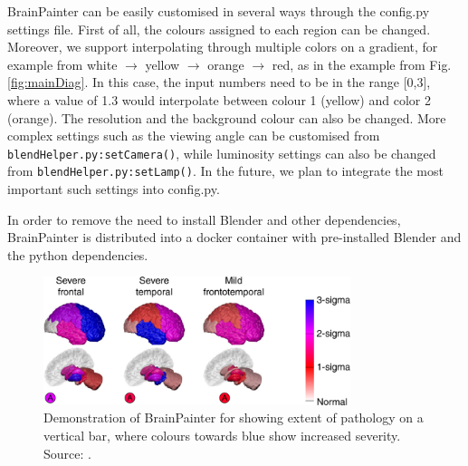 \documentclass{llncs}
\begin{document}

BrainPainter can be easily customised in several ways through the config.py settings file. First of all, the colours assigned to each region can be changed. Moreover, we support interpolating through multiple colors on a gradient, for example from white $\rightarrow$ yellow $\rightarrow$ orange $\rightarrow$ red, as in the example from Fig. \ref{fig:mainDiag}. In this case, the input numbers need to be in the range [0,3], where a value of 1.3 would interpolate between colour 1 (yellow) and color 2 (orange). The resolution and the background colour can also be changed. More complex settings such as the viewing angle can be customised from \verb|blendHelper.py:setCamera()|, while luminosity settings can also be changed from \verb|blendHelper.py:setLamp()|. In the future, we plan to integrate the most important such settings into config.py. 

In order to remove the need to install Blender and other dependencies, BrainPainter is distributed into a docker container with pre-installed Blender and the python dependencies. 


\begin{figure}
\centering
 \includegraphics[width=0.8\textwidth]{images/young_3brains.png}
 \caption{Demonstration of BrainPainter for showing extent of pathology on a vertical bar, where colours towards blue show increased severity. Source: \cite{young2018uncovering}.}
 \label{fig:youngExtent}
\end{figure}
\end{document}
